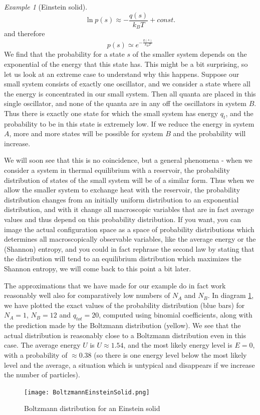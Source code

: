 \documentclass[a4paper, draft]{article}
\theoremstyle{own}
\theoremstyle{remark}
\newtheorem{example}{Example}[section]
\begin{document}
\begin{example}[Einstein solid]
$$
\ln p(s) \approx - \frac{q(s)}{k_B T} + const.
$$ 
and therefore 
$$
p(s) \simeq e^{- \frac{q(s)}{k_B T}}
$$
We find that the probability for a state $s$ of the smaller system depends on the exponential of the energy that this state has. This might be a bit surprising, so let us look at an extreme case to understand why this happens. Suppose our small system consists of exactly one oscillator, and we consider a state where all the energy is concentrated in our small system. Then all quanta are placed in this single oscillator, and none of the quanta are in any off the oscillators in system $B$. Thus there is exactly one state for which the small system has energy $q_t$, and the probability to be in this state is extremely low. If we reduce the energy in system $A$, more and more states will be possible for system $B$ and the probability will increase. 

We will soon see that this is no coincidence, but a general phenomena - when we consider a system in thermal equilibrium with a reservoir, the probability distribution of states of the small system will be of a similar form. Thus when we allow the smaller system to exchange heat with the reservoir, the probability distribution changes from an initially uniform distribution to an exponential distribution, and with it change all macroscopic variables that are in fact average values and thus depend on this probability distribution. If you want, you can image the actual configuration space as a space of probability distributions which determines all macroscopically observable variables, like the average energy or the (Shannon) entropy, and you could in fact rephrase the second law by stating that the distribution will tend to an equilibrium distribution which maximizes the Shannon entropy, we will come back to this point a bit later.


The approximations that we have made for our example do in fact work reasonably well also for comparatively low numbers of $N_A$ and $N_B$. In diagram \ref{fig:BoltzmannEinsteinSolid}, we have plotted the exact values of the probability distribution (blue bars) for $N_A = 1$, $N_B = 12$ and $q_{tot} = 20$, computed using binomial coefficients, along with the prediction made by the Boltzmann distribution (yellow). We see that the actual distribution is reasonably close to a Boltzmann distribution even in this case. The average energy $U$ is $U \approx 1.54$, and the most likely energy level is $E = 0$, with a probability of $\approx 0.38$ (so there is one energy level below the most likely level and the average, a situation which is untypical and disappears if we increase the number of particles).
	
\begin{figure}[ht]
		\centering
		\texttt{[image: BoltzmannEinsteinSolid.png]}
		\caption{Boltzmann distribution for an Einstein solid}
		\label{fig:BoltzmannEinsteinSolid}
\end{figure}
	
	
\end{example}
\end{document}
